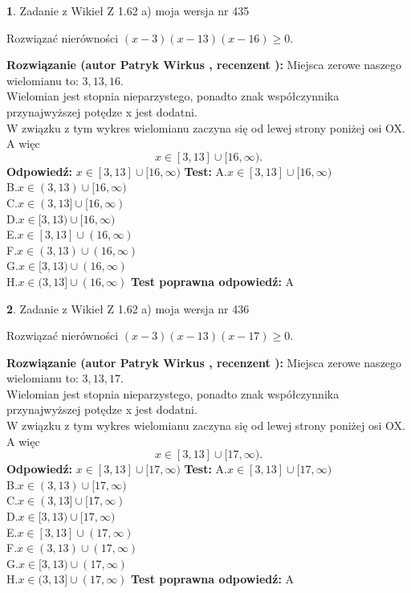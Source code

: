 \documentclass[12pt, a4paper]{article}
\theoremstyle{definition} %
\newtheorem{zad}{}
\newcommand{\zadStart}[1]{\begin{zad}#1\newline}
\newcommand{\zadStop}{\end{zad}}
\newcommand{\rozwStart}[2]{\noindent \textbf{Rozwiązanie (autor #1 , recenzent #2): }\newline}
\newcommand{\rozwStop}{\newline}
\newcommand{\odpStart}{\noindent \textbf{Odpowiedź:}\newline}
\newcommand{\odpStop}{\newline}
\newcommand{\testStart}{\noindent \textbf{Test:}\newline}
\newcommand{\testStop}{\newline}
\newcommand{\kluczStart}{\noindent \textbf{Test poprawna odpowiedź:}\newline}
\newcommand{\kluczStop}{\newline}
\begin{document}
\zadStart{Zadanie z Wikieł Z 1.62 a) moja wersja nr 435}

Rozwiązać nierówności $(x-3)(x-13)(x-16)\ge0$.
\zadStop
\rozwStart{Patryk Wirkus}{}
Miejsca zerowe naszego wielomianu to: $3, 13, 16$.\\
Wielomian jest stopnia nieparzystego, ponadto znak współczynnika przy\linebreak najwyższej potędze x jest dodatni.\\ W związku z tym wykres wielomianu zaczyna się od lewej strony poniżej osi OX. A więc $$x \in [3,13] \cup [16,\infty).$$
\rozwStop
\odpStart
$x \in [3,13] \cup [16,\infty)$
\odpStop
\testStart
A.$x \in [3,13] \cup [16,\infty)$\\
B.$x \in (3,13) \cup [16,\infty)$\\
C.$x \in (3,13] \cup [16,\infty)$\\
D.$x \in [3,13) \cup [16,\infty)$\\
E.$x \in [3,13] \cup (16,\infty)$\\
F.$x \in (3,13) \cup (16,\infty)$\\
G.$x \in [3,13) \cup (16,\infty)$\\
H.$x \in (3,13] \cup (16,\infty)$
\testStop
\kluczStart
A
\kluczStop



\zadStart{Zadanie z Wikieł Z 1.62 a) moja wersja nr 436}

Rozwiązać nierówności $(x-3)(x-13)(x-17)\ge0$.
\zadStop
\rozwStart{Patryk Wirkus}{}
Miejsca zerowe naszego wielomianu to: $3, 13, 17$.\\
Wielomian jest stopnia nieparzystego, ponadto znak współczynnika przy\linebreak najwyższej potędze x jest dodatni.\\ W związku z tym wykres wielomianu zaczyna się od lewej strony poniżej osi OX. A więc $$x \in [3,13] \cup [17,\infty).$$
\rozwStop
\odpStart
$x \in [3,13] \cup [17,\infty)$
\odpStop
\testStart
A.$x \in [3,13] \cup [17,\infty)$\\
B.$x \in (3,13) \cup [17,\infty)$\\
C.$x \in (3,13] \cup [17,\infty)$\\
D.$x \in [3,13) \cup [17,\infty)$\\
E.$x \in [3,13] \cup (17,\infty)$\\
F.$x \in (3,13) \cup (17,\infty)$\\
G.$x \in [3,13) \cup (17,\infty)$\\
H.$x \in (3,13] \cup (17,\infty)$
\testStop
\kluczStart
A
\kluczStop
\end{document}
